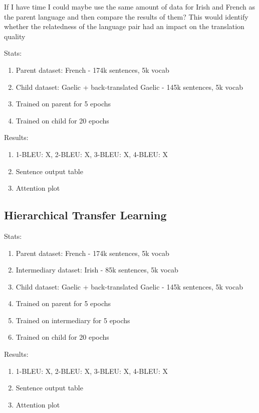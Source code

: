 If I have time I could maybe use the same amount of data for Irish and French as the parent language and then compare the results of them? This would identify whether the relatedness of the language pair had an impact on the translation quality

Stats:
\begin{enumerate}
    \item Parent dataset: French - 174k sentences, 5k vocab
    \item Child dataset: Gaelic + back-translated Gaelic - 145k sentences, 5k vocab
    \item Trained on parent for 5 epochs
    \item Trained on child for 20 epochs
\end{enumerate}

Results:
\begin{enumerate}
    \item 1-BLEU: X, 2-BLEU: X, 3-BLEU: X, 4-BLEU: X
    \item Sentence output table
    \item Attention plot
\end{enumerate}

\subsection{Hierarchical Transfer Learning}
\label{sec:4-hierarchical}
Stats:
\begin{enumerate}
    \item Parent dataset: French - 174k sentences, 5k vocab
    \item Intermediary dataset: Irish - 85k sentences, 5k vocab
    \item Child dataset: Gaelic + back-translated Gaelic - 145k sentences, 5k vocab
    \item Trained on parent for 5 epochs
    \item Trained on intermediary for 5 epochs
    \item Trained on child for 20 epochs
\end{enumerate}

Results:
\begin{enumerate}
    \item 1-BLEU: X, 2-BLEU: X, 3-BLEU: X, 4-BLEU: X
    \item Sentence output table
    \item Attention plot
\end{enumerate}